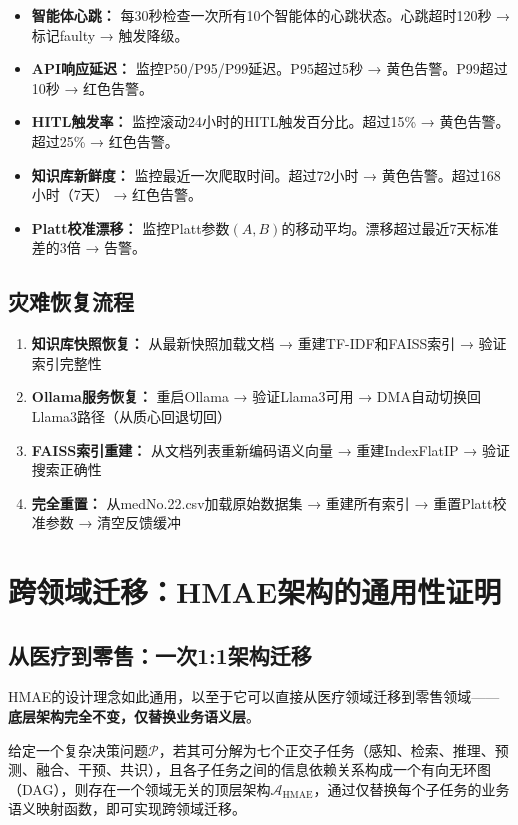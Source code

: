 \documentclass[11pt,a4paper]{ctexart}
\begin{document}
\begin{itemize}[nosep]
\item \textbf{智能体心跳：} 每30秒检查一次所有10个智能体的心跳状态。心跳超时120秒 → 标记faulty → 触发降级。
\item \textbf{API响应延迟：} 监控P50/P95/P99延迟。P95超过5秒 → 黄色告警。P99超过10秒 → 红色告警。
\item \textbf{HITL触发率：} 监控滚动24小时的HITL触发百分比。超过15\% → 黄色告警。超过25\% → 红色告警。
\item \textbf{知识库新鲜度：} 监控最近一次爬取时间。超过72小时 → 黄色告警。超过168小时（7天） → 红色告警。
\item \textbf{Platt校准漂移：} 监控Platt参数$(A,B)$的移动平均。漂移超过最近7天标准差的3倍 → 告警。
\end{itemize}

\subsection{灾难恢复流程}

\begin{enumerate}[nosep]
\item \textbf{知识库快照恢复：} 从最新快照加载文档 → 重建TF-IDF和FAISS索引 → 验证索引完整性
\item \textbf{Ollama服务恢复：} 重启Ollama → 验证Llama3可用 → DMA自动切换回Llama3路径（从质心回退切回）
\item \textbf{FAISS索引重建：} 从文档列表重新编码语义向量 → 重建IndexFlatIP → 验证搜索正确性
\item \textbf{完全重置：} 从medNo.22.csv加载原始数据集 → 重建所有索引 → 重置Platt校准参数 → 清空反馈缓冲
\end{enumerate}



\section{跨领域迁移：HMAE架构的通用性证明}

\subsection{从医疗到零售：一次1:1架构迁移}

HMAE的设计理念如此通用，以至于它可以直接从医疗领域迁移到零售领域——\textbf{底层架构完全不变，仅替换业务语义层}。

\begin{defbox}[HMAE架构不变性原理]
给定一个复杂决策问题$\mathcal{P}$，若其可分解为七个正交子任务（感知、检索、推理、预测、融合、干预、共识），且各子任务之间的信息依赖关系构成一个有向无环图（DAG），则存在一个领域无关的顶层架构$\mathcal{A}_{\text{HMAE}}$，通过仅替换每个子任务的业务语义映射函数，即可实现跨领域迁移。
\end{defbox}
\end{document}
